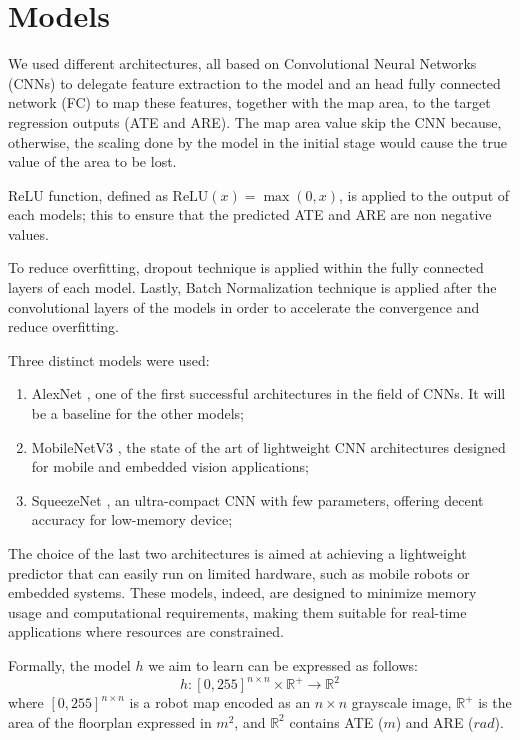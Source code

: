 \section{Models}

We used different architectures, all based on Convolutional Neural Networks (CNNs) to delegate
feature extraction to the model and an head fully connected network (FC) to map these features, together with the
map area, to the target regression outputs (ATE and ARE). The map area value skip the CNN because,
otherwise, the scaling done by the model in the initial stage would cause the true value of the area to be lost.

ReLU function, defined as $\text{ReLU}(x) = \max(0, x)$, is applied to the output of each models; this to ensure
that the predicted ATE and ARE are non negative values. 

To reduce overfitting, dropout technique \cite{srivastava2014dropout} is applied within the fully
connected layers of each model.
Lastly, Batch Normalization technique \cite{ioffe2015batchnormalizationacceleratingdeep} is applied after the 
convolutional layers of the models in order to accelerate the convergence and reduce overfitting.


Three distinct models were used:
\begin{enumerate}
    \item AlexNet \cite{NIPS2012_c399862d}, one of the first successful architectures in the field of CNNs. It will be a baseline for the other models;
    \item MobileNetV3 \cite{howard2019searchingmobilenetv3}, the state of the art of
        lightweight CNN architectures designed for mobile and embedded vision applications;
    \item SqueezeNet \cite{iandola2016squeezenetalexnetlevelaccuracy50x}, an ultra-compact CNN with 
        few parameters, offering decent accuracy for low-memory device;
\end{enumerate}

\noindent
The choice of the last two architectures is aimed at achieving a lightweight predictor that can easily run on limited hardware, such as mobile robots or embedded systems. These models, indeed, are designed to minimize memory
usage and computational requirements, making them suitable for real-time applications where resources are 
constrained.

\noindent
Formally, the model $h$ we aim to learn can be expressed as follows:
$$ h: [0,255]^{n\times n} \times \mathbb{R}^+ \rightarrow \mathbb{R}^2 $$
where $[0,255]^{n\times n}$ is a robot map encoded as an $n\times n$ grayscale image, $\mathbb{R}^+$ 
is the area of the floorplan expressed in $m^2$, and $\mathbb{R}^2$ contains ATE ($m$) and ARE ($rad$).


